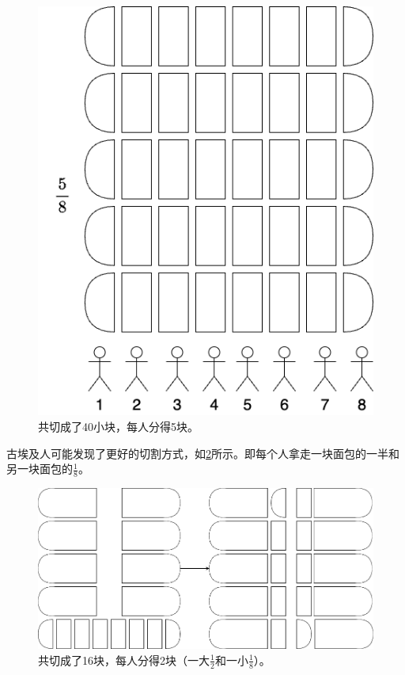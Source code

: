 \documentclass[b5paper]{ctexart}
\begin{document}
\begin{figure}[htbp]
 \centering
 \includegraphics[scale=0.3]{img/evenly-divide}
 \caption{共切成了40小块，每人分得5块。}
 \label{fig:evenly-devide}
\end{figure}

古埃及人可能发现了更好的切割方式，如\cref{fig:egyptian-devide}所示。即每个人拿走一块面包的一半和另一块面包的$\frac{1}{8}$。

\begin{figure}[htbp]
 \centering
 \includegraphics[scale=0.3]{img/egyptian-divide}
 \caption{共切成了16块，每人分得2块（一大$\frac{1}{2}$和一小$\frac{1}{8}$）。}
 \label{fig:egyptian-devide}
\end{figure}
\end{document}
